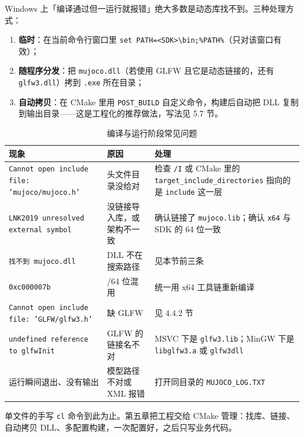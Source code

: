 Windows 上「编译通过但一运行就报错」绝大多数是动态库找不到。三种处理方式：

\begin{enumerate}
	\item \textbf{临时}：在当前命令行窗口里 \texttt{set PATH=<SDK>\textbackslash{}bin;\%PATH\%}（只对该窗口有效）；
	\item \textbf{随程序分发}：把 \texttt{mujoco.dll}（若使用 GLFW 且它是动态链接的，还有 \texttt{glfw3.dll}）拷到 \texttt{.exe} 所在目录；
	\item \textbf{自动拷贝}：在 CMake 里用 \texttt{POST\_BUILD} 自定义命令，构建后自动把 DLL 复制到输出目录——这是工程化的推荐做法，写法见 5.7 节。
\end{enumerate}

\begin{table}[H]
	\centering
	\caption{编译与运行阶段常见问题}
	\label{tab:Cpp:报错}
	\footnotesize
	\begin{tabular}{>{\raggedright\arraybackslash}p{4.4cm}>{\raggedright\arraybackslash}p{4.4cm}>{\raggedright\arraybackslash}p{5.4cm}}
		\hline
		现象 & 原因 & 处理 \\
		\hline
		\texttt{Cannot open include file: 'mujoco/mujoco.h'} & 头文件目录没给对 & 检查 \texttt{/I} 或 CMake 里的 \texttt{target\_include\_directories} 指向的是 \texttt{include} 这一层 \\
		\texttt{LNK2019 unresolved external symbol} & 没链接导入库，或架构不一致 & 确认链接了 \texttt{mujoco.lib}；确认 \texttt{x64} 与 SDK 的 64 位一致 \\
		\texttt{找不到 mujoco.dll} & DLL 不在搜索路径 & 见本节前三条 \\
		\texttt{0xc000007b} & 32/64 位混用 & 统一用 x64 工具链重新编译 \\
		\texttt{Cannot open include file: 'GLFW/glfw3.h'} & 缺 GLFW & 见 4.4.2 节 \\
		\texttt{undefined reference to glfwInit} & GLFW 的链接名不对 & MSVC 下是 \texttt{glfw3.lib}；MinGW 下是 \texttt{libglfw3.a} 或 \texttt{glfw3dll} \\
		运行瞬间退出、没有输出 & 模型路径不对或 XML 报错 & 打开同目录的 \texttt{MUJOCO\_LOG.TXT} \\
		\hline
	\end{tabular}
\end{table}

\begin{tipbox}[下一步]
	单文件的手写 \texttt{cl} 命令到此为止。第五章把工程交给 CMake 管理：找库、链接、自动拷贝 DLL、多配置构建，一次配置好，之后只写业务代码。
\end{tipbox}
